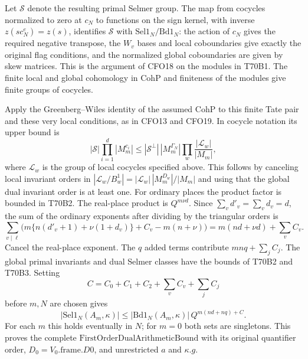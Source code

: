 Let $\mathcal S$ denote the resulting primal Selmer group.
The map from cocycles normalized to zero at $c_N$ to functions
on the sign kernel, with inverse $z(sc_N^e)=z(s)$, identifies
$\mathcal S$ with $\mathrm{Sel1}_N/\mathrm{Bd1}_N$: the action
of $c_N$ gives the required negative transpose, the $W_v$ bases
and local coboundaries give exactly the original flag
conditions, and the normalized global coboundaries are given
by skew matrices. This is the argument of CFO18 on the modules
in T70B1. The finite local and global cohomology in $\mathrm{CohP}$
and finiteness of the modules give finite groups of cocycles.

Apply the Greenberg--Wiles identity of the assumed $\mathrm{CohP}$
to this finite Tate pair and these very local conditions,
as in CFO13 and CFO19. In cocycle notation its upper bound is
\[
 |\mathcal S|\prod_{i=1}^d |M_m^{c_i}|
 \le |\mathcal S^\perp|\,|M_m^{\Gamma_N}|
               \prod_{w}\frac{|\mathcal L_w|}{|M_m|},
\]
where $\mathcal L_w$ is the group of local cocycles specified
above. This follows by canceling local invariant orders in
$|\mathcal L_w/B^1_w|=|\mathcal L_w|\,|M_m^{D_w}|/|M_m|$
and using that the global dual invariant order is at least one.
For ordinary places the product factor is bounded in T70B2.
The real-place product is $Q^{m\nu d}$. Since
$\sum_v d'_v=\sum_v d_v=d$, the sum of the ordinary exponents
after dividing by the triangular orders is
\[
 \sum_{v\mid\ell}\!
  \bigl(m\{n(d'_v+1)+\nu(1+d_v)\}+C_v-m(n+\nu)\bigr)
       =m(nd+\nu d)+\sum_v C_v .
\]
Cancel the real-place exponent. The $q$ added terms contribute
$mnq+\sum_j C_j$. The global primal invariants and dual Selmer
classes have the bounds of T70B2 and T70B3. Setting
\[
 C=C_0+C_1+C_2+\sum_v C_v+\sum_j C_j
\]
before $m,N$ are chosen gives
\[
 |\mathrm{Sel1}_N(A_m,\kappa)|
 \le |\mathrm{Bd1}_N(A_m,\kappa)|\,Q^{m(nd+nq)+C}.
\]
For each $m$ this holds eventually in $N$; for $m=0$ both sets
are singletons. This proves the complete
$\mathrm{FirstOrderDualArithmeticBound}$ with its original
quantifier order, $D_0=V_0.\mathrm{frame}.D0$, and unrestricted
$a$ and $\kappa.g$.
